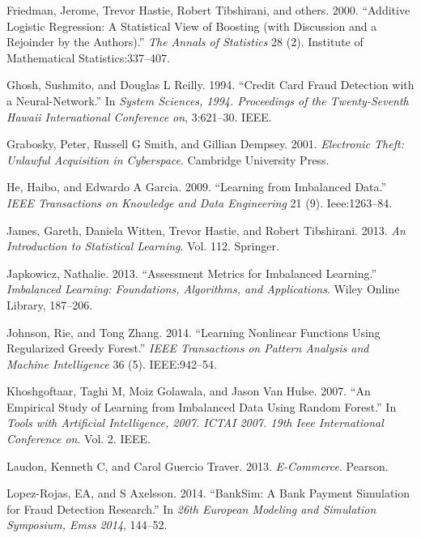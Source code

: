 \documentclass[12pt,]{article}
\begin{document}
\leavevmode\hypertarget{ref-friedman2000additive}{}%
Friedman, Jerome, Trevor Hastie, Robert Tibshirani, and others. 2000.
``Additive Logistic Regression: A Statistical View of Boosting (with
Discussion and a Rejoinder by the Authors).'' \emph{The Annals of
Statistics} 28 (2). Institute of Mathematical Statistics:337--407.

\leavevmode\hypertarget{ref-ghosh1994credit}{}%
Ghosh, Sushmito, and Douglas L Reilly. 1994. ``Credit Card Fraud
Detection with a Neural-Network.'' In \emph{System Sciences, 1994.
Proceedings of the Twenty-Seventh Hawaii International Conference on},
3:621--30. IEEE.

\leavevmode\hypertarget{ref-grabosky2001electronic}{}%
Grabosky, Peter, Russell G Smith, and Gillian Dempsey. 2001.
\emph{Electronic Theft: Unlawful Acquisition in Cyberspace}. Cambridge
University Press.

\leavevmode\hypertarget{ref-he2009learning}{}%
He, Haibo, and Edwardo A Garcia. 2009. ``Learning from Imbalanced
Data.'' \emph{IEEE Transactions on Knowledge and Data Engineering} 21
(9). Ieee:1263--84.

\leavevmode\hypertarget{ref-james2013introduction}{}%
James, Gareth, Daniela Witten, Trevor Hastie, and Robert Tibshirani.
2013. \emph{An Introduction to Statistical Learning}. Vol. 112.
Springer.

\leavevmode\hypertarget{ref-japkowicz2013assessment}{}%
Japkowicz, Nathalie. 2013. ``Assessment Metrics for Imbalanced
Learning.'' \emph{Imbalanced Learning: Foundations, Algorithms, and
Applications}. Wiley Online Library, 187--206.

\leavevmode\hypertarget{ref-johnson2014learning}{}%
Johnson, Rie, and Tong Zhang. 2014. ``Learning Nonlinear Functions Using
Regularized Greedy Forest.'' \emph{IEEE Transactions on Pattern Analysis
and Machine Intelligence} 36 (5). IEEE:942--54.

\leavevmode\hypertarget{ref-khoshgoftaar2007empirical}{}%
Khoshgoftaar, Taghi M, Moiz Golawala, and Jason Van Hulse. 2007. ``An
Empirical Study of Learning from Imbalanced Data Using Random Forest.''
In \emph{Tools with Artificial Intelligence, 2007. ICTAI 2007. 19th Ieee
International Conference on}. Vol. 2. IEEE.

\leavevmode\hypertarget{ref-laudon2013commerce}{}%
Laudon, Kenneth C, and Carol Guercio Traver. 2013. \emph{E-Commerce}.
Pearson.

\leavevmode\hypertarget{ref-lopez2014banksim}{}%
Lopez-Rojas, EA, and S Axelsson. 2014. ``BankSim: A Bank Payment
Simulation for Fraud Detection Research.'' In \emph{26th European
Modeling and Simulation Symposium, Emss 2014}, 144--52.
\end{document}
